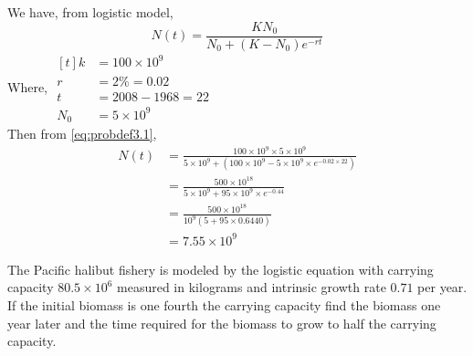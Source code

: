 \documentclass[../main-sheet.tex]{subfiles}
\begin{document}
\begin{soln}
    We have, from logistic model,
    \begin{equation}
        N(t)=\frac{K N_0}{N_0+(K-N_0)e^{-rt}}\label{eq:probdef3.1}
    \end{equation}
    Where, \(\begin{aligned}[t]
        k&=100\times 10^9\\
        r&=2\% = 0.02\\
        t&=2008-1968=22\\
        N_0&=5\times 10^9
    \end{aligned}\)\\

    Then from \eqref{eq:probdef3.1},
    \begin{align*}
        N(t)&=\frac{100\times 10^9\times 5\times10^9}{5\times 10^9+(100\times 10^9-5\times 10^9\times e^{-0.02\times 22})}\\
        &=\frac{500\times 10^{18}}{5\times 10^9+95\times 10^9\times e^{-0.44}}\\
        &=\frac{500\times 10^{18}}{10^9(5+95\times 0.6440)}\\
        &=7.55\times 10^9
    \end{align*}
\end{soln}
\begin{prob}
    The Pacific halibut fishery is modeled by the logistic equation with carrying capacity \(80.5\times 10^6\) measured in kilograms and intrinsic growth rate \(0.71\) per year. If the initial biomass is one fourth the carrying capacity find the biomass one year later and the time required for the biomass to grow to half the carrying capacity.
\end{prob}
\end{document}

